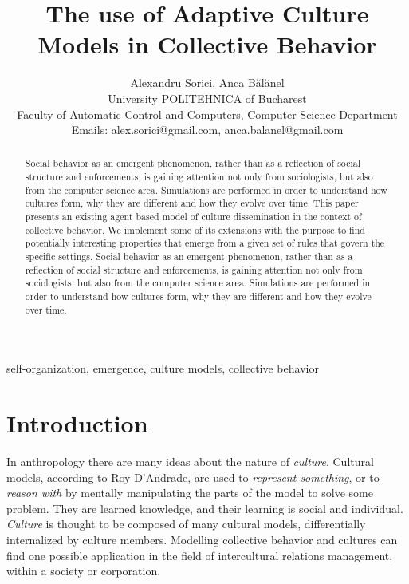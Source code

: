 \documentclass[twoside, 11pt, a4paper]{article}
\begin{document}
\title{The use of Adaptive Culture Models in Collective Behavior}

\author{\name Alexandru Sorici, Anca B\u{a}l\u{a}nel\\
       \addr University POLITEHNICA of Bucharest\\
       Faculty of Automatic Control and Computers, Computer Science Department\\
       \email Emails: alex.sorici@gmail.com, anca.balanel@gmail.com}

\maketitle

\begin{abstract}
Social behavior as an emergent phenomenon, rather than as a reflection of social structure and enforcements, is gaining attention not only from sociologists, but also from the computer science area. Simulations are performed in order to understand how cultures form, why they are different and how they evolve over time. This paper presents an existing agent based model of culture dissemination in the context of collective behavior. We implement some of its extensions with the purpose to find potentially interesting properties that emerge from a given set of rules that govern the specific settings. Social behavior as an emergent phenomenon, rather than as a reflection of social structure and enforcements, is gaining attention not only from sociologists, but also from the computer science area. Simulations are performed in order to understand how cultures form, why they are different and how they evolve over time. 
\end{abstract}

\begin{keywords}
self-organization, emergence, culture models, collective behavior
\end{keywords}

\section{Introduction}

In anthropology there are many ideas about the nature of \emph{culture}. Cultural models, according to Roy D'Andrade, are used to \emph{represent something}, or to \emph{reason with} by mentally manipulating the parts of the model to solve some problem. They are learned knowledge, and their learning is social and individual. \emph{Culture} is thought to be composed of many cultural models, differentially internalized by culture members. Modelling collective behavior and cultures can find one possible application in the field of intercultural relations management, within a society or corporation.
\end{document}
